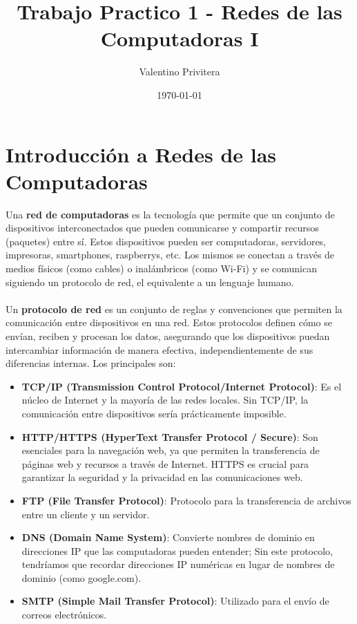 \documentclass{article}
\title{\textbf{Trabajo Practico 1 - Redes de las Computadoras I}}
\author{Valentino Privitera}
\date{\today}
\begin{document}
\maketitle


\section{Introducción a Redes de las Computadoras}

Una \textbf{red de computadoras} es la tecnología que permite que un conjunto de dispositivos interconectados que pueden comunicarse y compartir recursos (paquetes) entre sí. Estos dispositivos pueden ser computadoras, servidores, impresoras, smartphones, raspberrys, etc. Los mismos se conectan a través de medios físicos (como cables) o inalámbricos (como Wi-Fi) y se comunican siguiendo un protocolo de red, el equivalente a un lenguaje humano.
\\ \\
Un \textbf{protocolo de red} es un conjunto de reglas y convenciones que permiten la comunicación entre dispositivos en una red. Estos protocolos definen cómo se envían, reciben y procesan los datos, asegurando que los dispositivos puedan intercambiar información de manera efectiva, independientemente de sus diferencias internas. Los principales son: 

\begin{itemize}
    \item \textbf{TCP/IP (Transmission Control Protocol/Internet Protocol)}: Es el núcleo de Internet y la mayoría de las redes locales. Sin TCP/IP, la comunicación entre dispositivos sería prácticamente imposible.
    
    \item \textbf{HTTP/HTTPS (HyperText Transfer Protocol / Secure)}: Son esenciales para la navegación web, ya que permiten la transferencia de páginas web y recursos a través de Internet. HTTPS es crucial para garantizar la seguridad y la privacidad en las comunicaciones web.
    
    \item \textbf{FTP (File Transfer Protocol)}: Protocolo para la transferencia de archivos entre un cliente y un servidor.

    \item \textbf{DNS (Domain Name System)}: Convierte nombres de dominio en direcciones IP que las computadoras pueden entender; Sin este protocolo, tendríamos que recordar direcciones IP numéricas en lugar de nombres de dominio (como google.com).

    \item \textbf{SMTP (Simple Mail Transfer Protocol)}: Utilizado para el envío de correos electrónicos.
\end{itemize}
\end{document}
